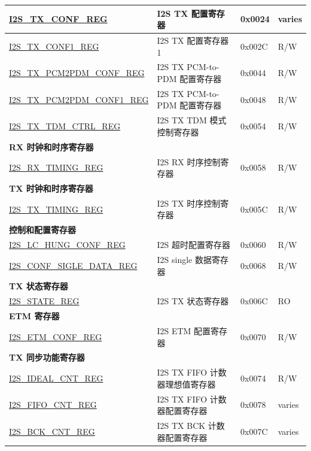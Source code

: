 \begin{longtable}{ | p{5.5cm} | p{7cm} | p{1.3cm} | p{2cm} | }
\hyperref[regdesc:I2STXCONFREG]{I2S\_TX\_CONF\_REG} & I2S TX 配置寄存器 & 0x0024 & varies \\ \hline
\hyperref[regdesc:I2STXCONF1REG]{I2S\_TX\_CONF1\_REG} & I2S TX 配置寄存器 1 & 0x002C & R/W \\ \hline
\hyperref[regdesc:I2STXPCM2PDMCONFREG]{I2S\_TX\_PCM2PDM\_CONF\_REG} & I2S TX PCM-to-PDM 配置寄存器 & 0x0044 & R/W \\ \hline
\hyperref[regdesc:I2STXPCM2PDMCONF1REG]{I2S\_TX\_PCM2PDM\_CONF1\_REG} & I2S TX PCM-to-PDM 配置寄存器 & 0x0048 & R/W \\ \hline
\hyperref[regdesc:I2STXTDMCTRLREG]{I2S\_TX\_TDM\_CTRL\_REG} & I2S TX TDM 模式控制寄存器 & 0x0054 & R/W \\ \hline
\multicolumn{4}{|l|}{\textbf{RX 时钟和时序寄存器}} \\ \hline
\hyperref[regdesc:I2SRXTIMINGREG]{I2S\_RX\_TIMING\_REG} & I2S RX 时序控制寄存器 & 0x0058 & R/W \\ \hline
\multicolumn{4}{|l|}{\textbf{TX 时钟和时序寄存器}} \\ \hline
\hyperref[regdesc:I2STXTIMINGREG]{I2S\_TX\_TIMING\_REG} & I2S TX 时序控制寄存器 & 0x005C & R/W \\ \hline
\multicolumn{4}{|l|}{\textbf{控制和配置寄存器}} \\ \hline
\hyperref[regdesc:I2SLCHUNGCONFREG]{I2S\_LC\_HUNG\_CONF\_REG} & I2S 超时配置寄存器 & 0x0060 & R/W \\ \hline
\hyperref[regdesc:I2SCONFSIGLEDATAREG]{I2S\_CONF\_SIGLE\_DATA\_REG} & I2S single 数据寄存器 & 0x0068 & R/W \\ \hline
\multicolumn{4}{|l|}{\textbf{TX 状态寄存器}} \\ \hline
\hyperref[regdesc:I2SSTATEREG]{I2S\_STATE\_REG} & I2S TX 状态寄存器 & 0x006C & RO \\ \hline
\multicolumn{4}{|l|}{\textbf{ETM 寄存器}} \\ \hline
\hyperref[regdesc:I2SETMCONFREG]{I2S\_ETM\_CONF\_REG} & I2S ETM 配置寄存器 & 0x0070 & R/W \\ \hline
\multicolumn{4}{|l|}{\textbf{TX 同步功能寄存器}} \\ \hline
\hyperref[regdesc:I2SIDEALCNTREG]{I2S\_IDEAL\_CNT\_REG} & I2S TX FIFO 计数器理想值寄存器 & 0x0074 & R/W \\ \hline
\hyperref[regdesc:I2SFIFOCNTREG]{I2S\_FIFO\_CNT\_REG} & I2S TX FIFO 计数器配置寄存器 & 0x0078 & varies \\ \hline
\hyperref[regdesc:I2SBCKCNTREG]{I2S\_BCK\_CNT\_REG} & I2S TX BCK 计数器配置寄存器 & 0x007C & varies \\ \hline

\end{longtable}
